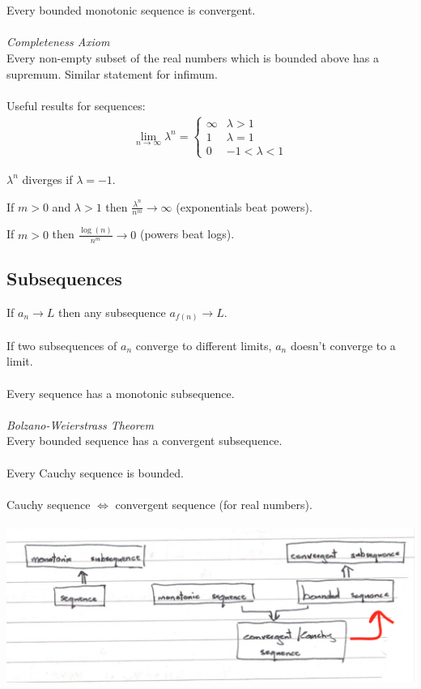 \documentclass{article}
\begin{document}
\\\\
Every bounded monotonic sequence is convergent.
\\\\
\textit{Completeness Axiom}
\\
Every non-empty subset of the real numbers which is bounded above has a supremum. Similar statement for infimum.
\\\\
Useful results for sequences:
\begin{align}
\lim_{n \to \infty} \lambda^{n} = 
\begin{cases}
\infty & \lambda > 1 \\
1 & \lambda = 1 \\
0 & -1 < \lambda < 1
\end{cases}
\end{align}
\begin{center}
$ \lambda^{n} $ diverges if $ \lambda = -1 $.
\end{center}
\begin{center}
If $ m > 0 $ and $ \lambda > 1 $ then $ \frac{\lambda^{n}}{n^{m}} \to \infty $ (exponentials beat powers).
\end{center}
\begin{center}
If $ m > 0 $ then $ \frac{\log(n)}{n^{m}} \to 0 $ (powers beat logs).
\end{center}

\subsection{Subsequences}
If $ a_{n} \to L $ then any subsequence $ a_{f(n)} \to L $.
\\\\
If two subsequences of $ a_{n} $ converge to different limits, $ a_{n} $ doesn't converge to a limit.
\\\\
Every sequence has a monotonic subsequence.
\\\\
\textit{Bolzano-Weierstrass Theorem}
\\
Every bounded sequence has a convergent subsequence.
\\\\
Every Cauchy sequence is bounded.
\\\\
Cauchy sequence $ \Leftrightarrow $ convergent sequence (for real numbers).
\\\\
\hspace*{-1in}
\includegraphics[scale=0.4]{sequences}
\end{document}

